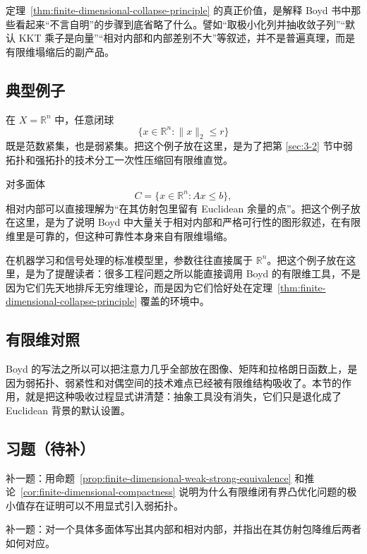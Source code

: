 \begin{remark}
定理~\ref{thm:finite-dimensional-collapse-principle} 的真正价值，是解释 Boyd 书中那些看起来“不言自明”的步骤到底省略了什么。譬如“取极小化列并抽收敛子列”“默认 KKT 乘子是向量”“相对内部和内部差别不大”等叙述，并不是普遍真理，而是有限维塌缩后的副产品。
\end{remark}

\subsection{典型例子}

\begin{example}[弱紧性与强紧性在有限维中一致]
在 $X=\mathbb R^n$ 中，任意闭球
\[
\{x\in \mathbb R^n:\|x\|_2\le r\}
\]
既是范数紧集，也是弱紧集。把这个例子放在这里，是为了把第 \ref{sec:3-2} 节中弱拓扑和强拓扑的技术分工一次性压缩回有限维直觉。
\end{example}

\begin{example}[相对内部与图形直觉]
对多面体
\[
C=\{x\in \mathbb R^n:Ax\le b\},
\]
相对内部可以直接理解为“在其仿射包里留有 Euclidean 余量的点”。把这个例子放在这里，是为了说明 Boyd 中大量关于相对内部和严格可行性的图形叙述，在有限维里是可靠的，但这种可靠性本身来自有限维塌缩。
\end{example}

\begin{example}[参数向量优化]
在机器学习和信号处理的标准模型里，参数往往直接属于 $\mathbb R^n$。把这个例子放在这里，是为了提醒读者：很多工程问题之所以能直接调用 Boyd 的有限维工具，不是因为它们先天地排斥无穷维理论，而是因为它们恰好处在定理~\ref{thm:finite-dimensional-collapse-principle} 覆盖的环境中。
\end{example}

\subsection*{有限维对照}

Boyd 的写法之所以可以把注意力几乎全部放在图像、矩阵和拉格朗日函数上，是因为弱拓扑、弱紧性和对偶空间的技术难点已经被有限维结构吸收了。本节的作用，就是把这种吸收过程显式讲清楚：抽象工具没有消失，它们只是退化成了 Euclidean 背景的默认设置。

\subsection*{习题（待补）}

\begin{exercise}[有限维塌缩占位]
补一题：用命题~\ref{prop:finite-dimensional-weak-strong-equivalence} 和推论~\ref{cor:finite-dimensional-compactness} 说明为什么有限维闭有界凸优化问题的极小值存在证明可以不用显式引入弱拓扑。
\end{exercise}

\begin{exercise}[相对内部桥接题占位]
补一题：对一个具体多面体写出其内部和相对内部，并指出在其仿射包降维后两者如何对应。
\end{exercise}
